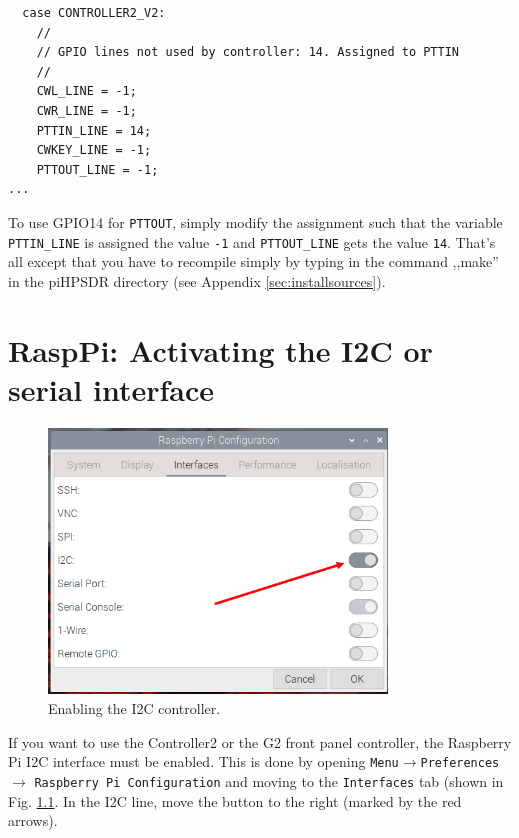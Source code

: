 \documentclass[12pt]{book}
\def\pH{pi\-HPSDR }
\begin{document}
\begin{small}
\begin{verbatim}
  case CONTROLLER2_V2:
    //
    // GPIO lines not used by controller: 14. Assigned to PTTIN
    //
    CWL_LINE = -1;
    CWR_LINE = -1;
    PTTIN_LINE = 14;
    CWKEY_LINE = -1;
    PTTOUT_LINE = -1;
...
\end{verbatim}
\end{small}

To use GPIO14 for \texttt{PTTOUT}, simply modify the assignment such that the variable
 \texttt{PTTIN\_LINE} is assigned the
value \texttt{-1} and \texttt{PTTOUT\_LINE} gets the value \texttt{14}.
 That's all except that you have to recompile
simply by typing in the command ,,make'' in the \pH directory (see Appendix \ref{sec:installsources}).


\chapter[RaspPi: Activating I2C]{RaspPi: Activating the I2C or serial interface}
\label{sec:i2c}

\begin{figure}[ht]
\center
\includegraphics[width=9cm]{piEnableI2C.png}
\caption{Enabling the I2C controller.}
\label{fig:piEnableI2C}
\end{figure}

If you want to use the Controller2 or the G2 front panel controller, the Raspberry Pi I2C interface
must be enabled. This is done by opening \texttt{Menu}$\to$\texttt{Preferences}$\to$
\texttt{Raspberry Pi Configuration} and moving to the \texttt{Interfaces} tab
(shown in Fig. \ref{fig:piEnableI2C}. In the I2C line, move the button to the right
(marked by the red arrows).
\end{document}
